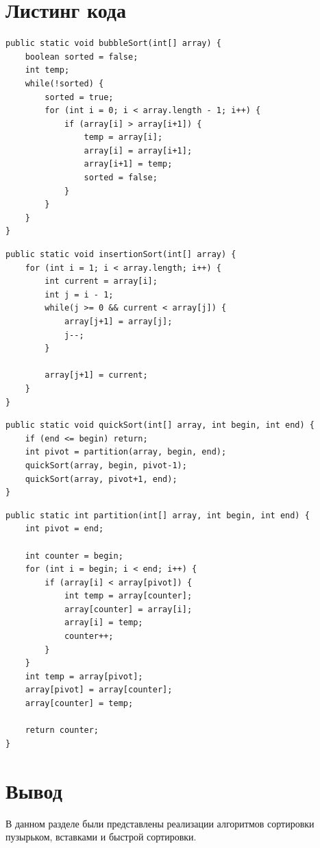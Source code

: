 \documentclass[12pt]{report}
\begin{document}
\section{Листинг кода}
\begin{lstlisting}[label=bubble,caption=Алгоритм сортировки пузырьком]
public static void bubbleSort(int[] array) {  
    boolean sorted = false;
    int temp;
    while(!sorted) {
        sorted = true;
        for (int i = 0; i < array.length - 1; i++) {
            if (array[i] > array[i+1]) {
                temp = array[i];
                array[i] = array[i+1];
                array[i+1] = temp;
                sorted = false;
            }
        }
    }
}
\end{lstlisting}
\newpage
\begin{lstlisting}[label=insertion,caption=Алгоритм сортировки вставками]
public static void insertionSort(int[] array) {  
    for (int i = 1; i < array.length; i++) {
        int current = array[i];
        int j = i - 1;
        while(j >= 0 && current < array[j]) {
            array[j+1] = array[j];
            j--;
        }
        
        array[j+1] = current;
    }
}
\end{lstlisting}

\begin{lstlisting}[label=quick,caption=Алгоритм быстрой сортировки]
public static void quickSort(int[] array, int begin, int end) {  
    if (end <= begin) return;
    int pivot = partition(array, begin, end);
    quickSort(array, begin, pivot-1);
    quickSort(array, pivot+1, end);
}
\end{lstlisting}

\begin{lstlisting}[label=pivot,caption=Алгоритм поиска опорного элемента]
public static int partition(int[] array, int begin, int end) {  
    int pivot = end;

    int counter = begin;
    for (int i = begin; i < end; i++) {
        if (array[i] < array[pivot]) {
            int temp = array[counter];
            array[counter] = array[i];
            array[i] = temp;
            counter++;
        }
    }
    int temp = array[pivot];
    array[pivot] = array[counter];
    array[counter] = temp;

    return counter;
}
\end{lstlisting}


\section{Вывод}
В данном разделе были представлены реализации алгоритмов сортировки пузырьком, вставками и быстрой сортировки.
\end{document}
